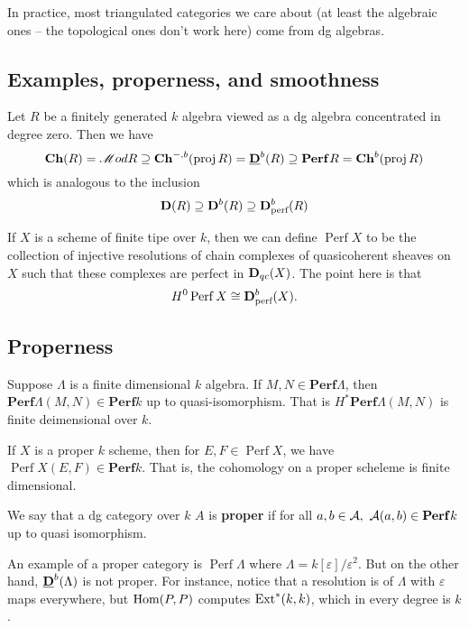\documentclass[12pt]{article}
\begin{document}
In practice, most triangulated categories we care about (at least the algebraic ones -- the topological ones don't work here) come from dg algebras.

\subsection{Examples, properness, and smoothness}
\begin{ex}
	Let $R$ be a finitely generated $k$ algebra viewed as a dg algebra concentrated in degree zero. Then we have 
	\[\operatorname{\mathbf{Ch}}(R)=\mathscr{M} od R\supseteq \operatorname{\mathbf{Ch}}^{-,b}(\operatorname{proj}R)=\underline{\mathbf{D}}^b(R)\supseteq \mathbf{Perf} R=\operatorname{\mathbf{Ch}}^b(\operatorname{proj} R)\]
	which is analogous to the inclusion 
	\[\mathbf{D}(R)\supseteq \mathbf{D}^b(R)\supseteq\mathbf{D}^b_{\text{perf}}(R)\]
\end{ex}

\begin{ex}
	If $X$ is a scheme of finite tipe over $k$, then we can define $\operatorname{Perf} X$ to be the collection of injective resolutions of chain complexes of 
	quasicoherent sheaves on $X$ such that these complexes are perfect in $\mathbf{D}_{qc}(X)$. The point here is that 
	\[H^0\operatorname{Perf}X\cong\mathbf{D}^b_{\text{perf}}(X).\]
\end{ex}

\subsection{Properness}
Suppose $\Lambda$ is a finite dimensional $k$ algebra. If $M,N\in\mathbf{Perf}\Lambda$, then $\mathbf{Perf}\Lambda(M,N)\in\mathbf{Perf}k$ up to quasi-isomorphism.
That is $H^\ast\mathbf{Perf}\Lambda(M,N)$ is finite deimensional over $k$.

If $X$ is a proper $k$ scheme, then for $E,F\in\operatorname{Perf}X$, we have $\operatorname{Perf}X(E,F)\in\mathbf{Perf}k$. That is, the cohomology on a proper scheleme is finite dimensional.

\begin{defn}
	We say that a dg category over $k$ $A$ is \textbf{proper} if for all $a,b\in\mathcal{A},$ $\mathcal{A}(a,b)\in\mathbf{Perf}k$ up to quasi isomorphism.
\end{defn}

An example of a proper category is $\operatorname{Perf}\Lambda$ where $\Lambda=k[\varepsilon]/\varepsilon^2$. But on the other hand, $\underline{\mathbf{D}}^b(\Lambda)$ is not proper. For instance,
notice that a resolution is of $\Lambda$ with $\varepsilon$ maps everywhere, but $\operatorname{Hom}(P,P)$ computes $\operatorname{Ext}^\ast(k,k)$, which in every degree is $k$.
\end{document}
